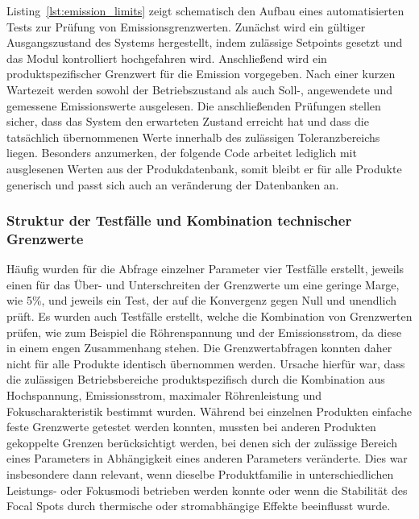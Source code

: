 \documentclass[12pt]{article} %
\begin{document}
Listing~\ref{lst:emission_limits} zeigt schematisch den Aufbau eines automatisierten Tests zur Prüfung von Emissionsgrenzwerten.
Zunächst wird ein gültiger Ausgangszustand des Systems hergestellt, indem zulässige Setpoints gesetzt und das Modul kontrolliert hochgefahren wird.
Anschließend wird ein produktspezifischer Grenzwert für die Emission vorgegeben.
Nach einer kurzen Wartezeit werden sowohl der Betriebszustand als auch Soll-, angewendete und gemessene Emissionswerte ausgelesen.
Die anschließenden Prüfungen stellen sicher, dass das System den erwarteten Zustand erreicht hat und dass die tatsächlich übernommenen Werte innerhalb des zulässigen Toleranzbereichs liegen.
Besonders anzumerken, der folgende Code arbeitet lediglich mit ausglesenen Werten aus der Produkdatenbank, somit bleibt er für alle Produkte generisch und passt sich auch an veränderung der Datenbanken an.
\\

\subsubsection{Struktur der Testfälle und Kombination technischer Grenzwerte}
Häufig wurden für die Abfrage einzelner Parameter vier Testfälle erstellt, jeweils einen für das Über- und Unterschreiten der Grenzwerte um eine geringe Marge, wie 5\%, und jeweils ein Test, der auf die Konvergenz gegen Null und unendlich prüft. Es wurden auch Testfälle erstellt, welche die Kombination von Grenzwerten prüfen, wie zum Beispiel die Röhrenspannung und der Emissionsstrom, da diese in einem engen Zusammenhang stehen. 
Die Grenzwertabfragen konnten daher nicht für alle Produkte identisch übernommen werden. Ursache hierfür war, dass die zulässigen Betriebsbereiche produktspezifisch durch die Kombination aus Hochspannung, Emissionsstrom, maximaler Röhrenleistung und Fokuscharakteristik bestimmt wurden. Während bei einzelnen Produkten einfache feste Grenzwerte getestet werden konnten, mussten bei anderen Produkten gekoppelte Grenzen berücksichtigt werden, bei denen sich der zulässige Bereich eines Parameters in Abhängigkeit eines anderen Parameters veränderte.
Dies war insbesondere dann relevant, wenn dieselbe Produktfamilie in unterschiedlichen Leistungs- oder Fokusmodi betrieben werden konnte oder wenn die Stabilität des Focal Spots durch thermische oder stromabhängige Effekte beeinflusst wurde.
\\
\\
\end{document}

